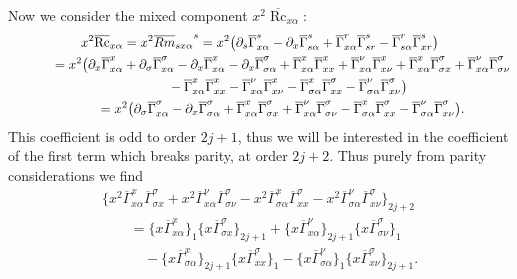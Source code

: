 \documentclass[11pt]{article}
\numberwithin{equation}{section}
\newcommand{\olGamma}{\overline{\Gamma}}
\DeclareMathOperator{\Rc}{Rc}
\begin{document}
Now we consider the mixed component $x^2 \overline{\Rc}_{x\alpha}$:
\begin{gather*}
x^2 \overline{\Rc}_{x \alpha} = x^2 {\overline{Rm}_{s x \alpha}}^{s}
= x^2 \big( \partial_s \olGamma_{x \alpha}^s - \partial_{x} \olGamma_{s \alpha}^s + \olGamma_{x \alpha}^r \olGamma_{sr}^s - \olGamma_{s \alpha}^r \olGamma_{x r}^s \big) \\
\hphantom{x^2 \overline{\Rc}_{x \alpha}}{}= x^2 \big( \partial_x \olGamma_{x \alpha}^x + \partial_{\sigma} \olGamma_{x \alpha}^{\sigma} - \partial_{x} \olGamma_{x \alpha}^x - \partial_{x} \olGamma_{\sigma \alpha}^{\sigma}
 + \olGamma_{x \alpha}^x \olGamma_{xx}^x + \olGamma_{x \alpha}^{\nu} \olGamma_{x\nu}^x + \olGamma_{x \alpha}^x \olGamma_{\sigma x}^{\sigma} + \olGamma_{x \alpha}^{\nu} \olGamma_{\sigma \nu}^{\sigma} \\
\hphantom{x^2 \overline{\Rc}_{x \alpha}=}{} - \olGamma_{x \alpha}^x \olGamma_{x x}^x - \olGamma_{x \alpha}^{\nu} \olGamma_{x \nu}^x
- \olGamma_{\sigma \alpha}^x \olGamma_{x x}^{\sigma}- \olGamma_{\sigma \alpha}^{\nu} \olGamma_{x \nu}^{\sigma} \big) \\
\hphantom{x^2 \overline{\Rc}_{x \alpha}}{}= x^2 \big( \partial_{\sigma} \olGamma_{x \alpha}^{\sigma} - \partial_{x} \olGamma_{\sigma \alpha}^{\sigma}+ \olGamma_{x \alpha}^x \olGamma_{\sigma x}^{\sigma} + \olGamma_{x \alpha}^{\nu} \olGamma_{\sigma \nu}^{\sigma} - \olGamma_{\sigma \alpha}^x \olGamma_{x x}^{\sigma}- \olGamma_{\sigma \alpha}^{\nu} \olGamma_{x \nu}^{\sigma} \big).
\end{gather*}
This coefficient is odd to order $2j+1$, thus we will be interested in the coefficient of the first term which breaks parity, at order $2j+2$. Thus purely from parity considerations we find
\begin{gather}
\big\{ x^2\olGamma_{x \alpha}^x \olGamma_{\sigma x}^{\sigma} + x^2\olGamma_{x \alpha}^{\nu} \olGamma_{\sigma \nu}^{\sigma} - x^2 \olGamma_{\sigma \alpha}^x \olGamma_{x x}^{\sigma}- x^2\olGamma_{\sigma \alpha}^{\nu} \olGamma_{x \nu}^{\sigma} \big\}_{2j+2} \nonumber \\
\qquad{} = \big\{x\olGamma_{x \alpha}^x\big\}_1 \big\{ x\olGamma_{\sigma x}^{\sigma}\big\}_{2j+1}+ \big\{x\olGamma_{x \alpha}^{\nu}\big\}_{2j+1} \big\{ x\olGamma_{\sigma \nu}^{\sigma}\big\}_1 \nonumber \\
\qquad\quad {}- \big\{x \olGamma_{\sigma \alpha}^x\big\}_{2j+1} \big\{ x\olGamma_{x x}^{\sigma}\big\}_1 - \big\{x\olGamma_{\sigma \alpha}^{\nu}\big\}_1 \big\{ x\olGamma_{x \nu}^{\sigma}\big\}_{2j+1}.\label{eqn:mixed-ref-3}
\end{gather}
\end{document}
